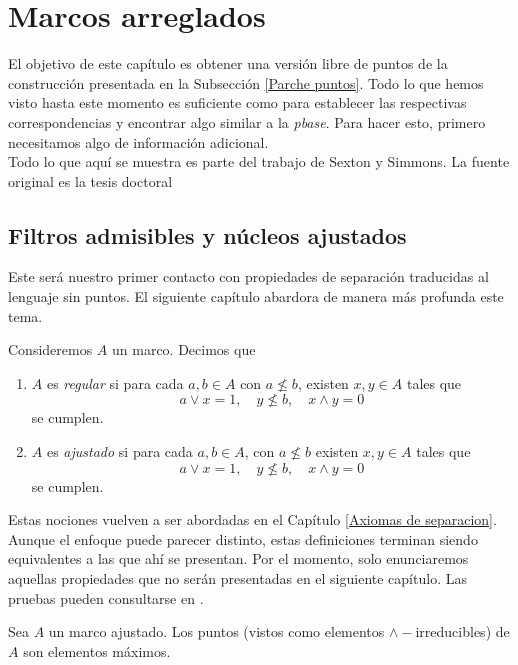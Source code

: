 \chapter{Marcos arreglados}\label{Parches}

El objetivo de este capítulo es obtener una versión libre de puntos de la construcción presentada en la Subsección \ref{Parche puntos}. 
Todo lo que hemos visto hasta este momento es suficiente como para establecer las respectivas correspondencias y encontrar algo similar 
a la \emph{pbase}. Para hacer esto, primero necesitamos algo de información adicional.\\

Todo lo que aquí se muestra es parte del trabajo de Sexton y Simmons. La fuente original es la tesis doctoral \cite{R.S.}

\section{Filtros admisibles y núcleos ajustados}
Este será nuestro primer contacto con propiedades de separación traducidas al lenguaje sin puntos. El siguiente capítulo abardora de manera 
más profunda este tema.

\begin{dfn}
Consideremos $A$ un marco. Decimos que 
\begin{enumerate}
\item $A$ es \emph{regular} si para cada $a,b\in A$ con $a\nleq b$, existen $x,y\in A$ tales que 
\[
a\vee x=1, \quad y\nleq b, \quad x\wedge y=0
\]
se cumplen.
\item $A$ es \emph{ajustado} si para cada $a, b\in A$, con $a\nleq b$ existen $x, y\in A$ tales que
\[
a\vee x=1,\quad y\nleq b, \quad x\wedge y=0
\]
se cumplen.
\end{enumerate}
\end{dfn}

Estas nociones vuelven a ser abordadas en el Capítulo \ref{Axiomas de separacion}. Aunque el enfoque puede parecer distinto, estas definiciones terminan siendo equivalentes a las que ahí se presentan. Por el momento, solo enunciaremos aquellas propiedades que no serán presentadas en el siguiente 
capítulo. Las pruebas pueden consultarse en \cite{R.S.}.

\begin{lem}
    Sea $A$ un marco ajustado. Los puntos (vistos como elementos $\wedge-$irreducibles) de $A$ son elementos máximos.
\end{lem}

